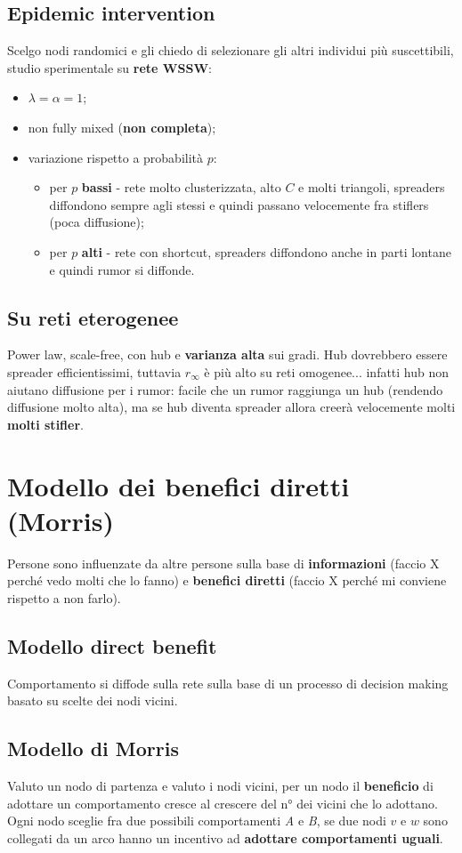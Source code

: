 \documentclass{article}
\begin{document}
  \subsection{Epidemic intervention}
    Scelgo nodi randomici e gli chiedo di selezionare gli altri individui più suscettibili, studio sperimentale su \textbf{rete WSSW}:
    \begin{itemize}
        \item $\lambda=\alpha=1$;
        \item non fully mixed (\textbf{non completa});
        \item variazione rispetto a probabilità $p$:
          \begin{itemize}
              \item per $p$ \textbf{bassi} - rete molto clusterizzata, alto $C$ e molti triangoli, spreaders diffondono sempre agli stessi e quindi passano velocemente fra stiflers (poca diffusione);
              \item per $p$ \textbf{alti} - rete con shortcut, spreaders diffondono anche in parti lontane e quindi rumor si diffonde.
          \end{itemize}
    \end{itemize}
  \subsection{Su reti eterogenee}
    Power law, scale-free, con hub e \textbf{varianza alta} sui gradi. Hub dovrebbero essere spreader efficientissimi, tuttavia $r_\infty$ è più alto su reti omogenee... infatti hub non aiutano diffusione per i rumor: facile che un rumor raggiunga un hub (rendendo diffusione molto alta), ma se hub diventa spreader allora creerà velocemente molti \textbf{molti stifler}.
\section{Modello dei benefici diretti (Morris)}
  Persone sono influenzate da altre persone sulla base di \textbf{informazioni} (faccio X perché vedo molti che lo fanno) e \textbf{benefici diretti} (faccio X perché mi conviene rispetto a non farlo).
  \subsection{Modello direct benefit}
    Comportamento si diffode sulla rete sulla base di un processo di decision making basato su scelte dei nodi vicini.
  \subsection{Modello di Morris}
    Valuto un nodo di partenza e valuto i nodi vicini, per un nodo il \textbf{beneficio} di adottare un comportamento cresce al crescere del n° dei vicini che lo adottano. Ogni nodo sceglie fra due possibili comportamenti \textit{A} e \textit{B}, se due nodi $v$ e $w$ sono collegati da un arco hanno un incentivo ad \textbf{adottare comportamenti uguali}.
\end{document}
